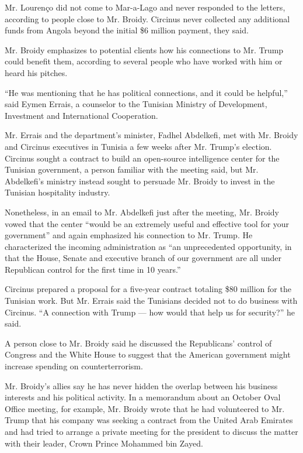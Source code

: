 Mr. Lourenço did not come to Mar-a-Lago and never responded to the
letters, according to people close to Mr. Broidy. Circinus never
collected any additional funds from Angola beyond the initial \$6
million payment, they said.

Mr. Broidy emphasizes to potential clients how his connections to Mr.
Trump could benefit them, according to several people who have worked
with him or heard his pitches.

``He was mentioning that he has political connections, and it could be
helpful,'' said Eymen Errais, a counselor to the Tunisian Ministry of
Development, Investment and International Cooperation.

Mr. Errais and the department's minister, Fadhel Abdelkefi, met with Mr.
Broidy and Circinus executives in Tunisia a few weeks after Mr. Trump's
election. Circinus sought a contract to build an open-source
intelligence center for the Tunisian government, a person familiar with
the meeting said, but Mr. Abdelkefi's ministry instead sought to
persuade Mr. Broidy to invest in the Tunisian hospitality industry.

Nonetheless, in an email to Mr. Abdelkefi just after the meeting, Mr.
Broidy vowed that the center ``would be an extremely useful and
effective tool for your government'' and again emphasized his connection
to Mr. Trump. He characterized the incoming administration as ``an
unprecedented opportunity, in that the House, Senate and executive
branch of our government are all under Republican control for the first
time in 10 years.''

Circinus prepared a proposal for a five-year contract totaling \$80
million for the Tunisian work. But Mr. Errais said the Tunisians decided
not to do business with Circinus. ``A connection with Trump --- how
would that help us for security?'' he said.

A person close to Mr. Broidy said he discussed the Republicans' control
of Congress and the White House to suggest that the American government
might increase spending on counterterrorism.

Mr. Broidy's allies say he has never hidden the overlap between his
business interests and his political activity. In a memorandum about an
October Oval Office meeting, for example, Mr. Broidy wrote that he had
volunteered to Mr. Trump that his company was seeking a contract from
the United Arab Emirates and had tried to arrange a private meeting for
the president to discuss the matter with their leader, Crown Prince
Mohammed bin Zayed.

